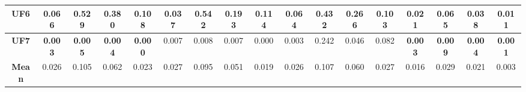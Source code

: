 \begin{table*}[t]
\begin{tabular}{cc|c|c|c|c|c|c|c|c|c|c|c|c|c|c|c}
\multicolumn{1}{c|}{\textbf{UF6}}   & 0.066          & 0.529          & 0.380          & 0.108          & 0.037          & 0.542          & 0.193          & 0.114          & 0.064          & 0.432          & 0.266          & 0.103          & \textbf{0.021} & \textbf{0.065} & \textbf{0.038} & \textbf{0.011} \\ \hline
\multicolumn{1}{c|}{\textbf{UF7}}   & \textbf{0.003} & \textbf{0.005} & \textbf{0.004} & \textbf{0.000} & 0.007          & 0.008          & 0.007          & 0.000          & 0.003          & 0.242          & 0.046          & 0.082          & \textbf{0.003} & \textbf{0.009} & \textbf{0.004} & \textbf{0.001} \\ \hline
\multicolumn{1}{c|}{\textbf{Mean}}  & 0.026          & 0.105          & 0.062          & 0.023          & 0.027          & 0.095          & 0.051          & 0.019          & 0.026          & 0.107          & 0.060          & 0.027          & 0.016          & 0.029          & 0.021          & 0.003          \\ \hline
\end{tabular}%
\end{table*}


